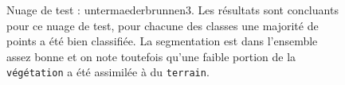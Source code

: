 \documentclass[a4paper, onecolumn, 11pt]{article}
\begin{document}
\begin{figure}[h]
    \caption{Nuage de test : untermaederbrunnen3. Les résultats sont concluants pour ce nuage de test, pour chacune des classes une majorité de points a été bien classifiée. La segmentation est dans l'ensemble assez bonne et on note toutefois qu'une faible portion de la \texttt{végétation} a été assimilée à du \texttt{terrain}.}
    \label{fig:untermaederbrunnen3}
\end{figure}

\begin{figure}[h]
    \centering
    \qquad
    \qquad

\end{figure}
\end{document}

